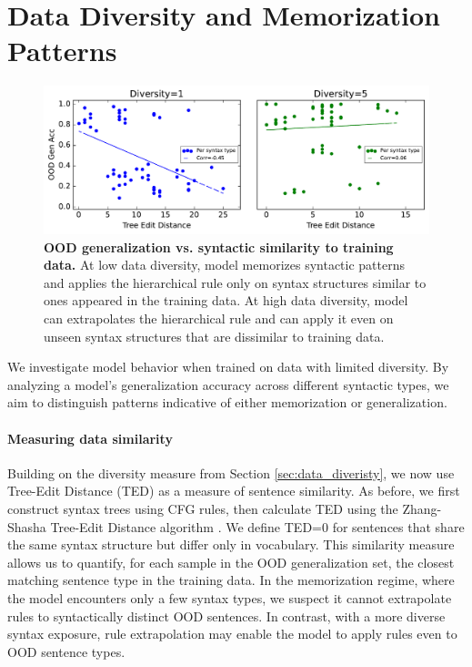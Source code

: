 \section{Data Diversity and Memorization Patterns}
\label{appdx:memorizaition}

\begin{figure}[h]
    \centering
    \includegraphics[width=0.8\linewidth]{figures/tree_edit_distance_performance.pdf}
    \caption{\textbf{OOD generalization vs. syntactic similarity to training data.} At low data diversity, model memorizes syntactic patterns and applies the hierarchical rule only on syntax structures similar to ones appeared in the training data. At high data diversity, model can extrapolates the hierarchical rule and can apply it even on unseen syntax structures that are dissimilar to training data.} 
    \label{fig:tree_edit_distance_performance}
\end{figure}

We investigate model behavior when trained on data with limited diversity. By analyzing a model's generalization accuracy across different syntactic types, we aim to distinguish patterns indicative of either memorization or generalization.

\paragraph{Measuring data similarity} Building on the diversity measure from Section \ref{sec:data_diveristy}, we now use Tree-Edit Distance (TED) as a measure of sentence similarity. As before, we first construct syntax trees using CFG rules, then calculate TED using the Zhang-Shasha Tree-Edit Distance algorithm \citep{Zhang1989-ma}. We define TED=0 for sentences that share the same syntax structure but differ only in vocabulary. This similarity measure allows us to quantify, for each sample in the OOD generalization set, the closest matching sentence type in the training data. In the memorization regime, where the model encounters only a few syntax types, we suspect it cannot extrapolate rules to syntactically distinct OOD sentences. In contrast, with a more diverse syntax exposure, rule extrapolation may enable the model to apply rules even to OOD sentence types.


